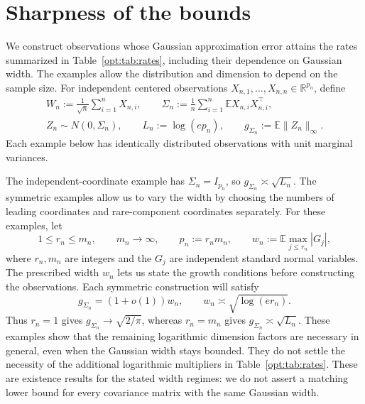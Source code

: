 \documentclass[11pt,letterpaper]{article}
\newenvironment{vSixBlock}{\color{magenta}}{}
\theoremstyle{remark}
\newcommand{\E}{\mathbb E}
\newcommand{\R}{\mathbb R}
\begin{document}
\section{Sharpness of the bounds}\label{opt:section}
\begin{vSixBlock}
We construct observations whose Gaussian approximation error attains
the rates summarized in Table~\ref{opt:tab:rates}, including their
dependence on Gaussian width. The examples allow the distribution
and dimension to depend on the sample size. For independent centered
observations \(X_{n,1},\ldots,X_{n,n}\in\R^{p_n}\), define
\begin{equation}
\begin{gathered}
 W_n:=\frac1{\sqrt n}\sum_{i=1}^nX_{n,i},\qquad
 \Sigma_n:=\frac1n\sum_{i=1}^n\E X_{n,i}X_{n,i}^{\top},\\
 Z_n\sim N(0,\Sigma_n),\qquad
 L_n:=\log(ep_n),\qquad g_{\Sigma_n}:=\E\|Z_n\|_\infty.
\end{gathered}
\label{lower:eq:setup}
\end{equation}
Each example below has identically distributed observations with unit
marginal variances.

The independent-coordinate example has \(\Sigma_n=I_{p_n}\), so
\(g_{\Sigma_n}\asymp\sqrt{L_n}\). The symmetric examples allow us
to vary the width by choosing the numbers of leading coordinates
and rare-component coordinates separately. For these examples, let
\begin{equation}
 1\le r_n\le m_n,\qquad m_n\to\infty,\qquad p_n:=r_nm_n,
 \qquad w_n:=\E\max_{j\le r_n}|G_j|,
 \label{lower:eq:dimensions}
\end{equation}
where \(r_n,m_n\) are integers and the \(G_j\) are independent
standard normal variables. The prescribed width \(w_n\) lets us
state the growth conditions before constructing the observations.
Each symmetric construction will satisfy
\begin{equation}
 g_{\Sigma_n}=(1+o(1))w_n,\qquad
 w_n\asymp\sqrt{\log(er_n)}.
 \label{lower:eq:width-profile}
\end{equation}
Thus \(r_n=1\) gives \(g_{\Sigma_n}\to\sqrt{2/\pi}\), whereas
\(r_n=m_n\) gives \(g_{\Sigma_n}\asymp\sqrt{L_n}\).
These examples show that the remaining logarithmic dimension
factors are necessary in general, even when the Gaussian width
stays bounded. They do not settle the necessity of the additional
logarithmic multipliers in Table~\ref{opt:tab:rates}.
These are existence results for the stated width regimes: we do
not assert a matching lower bound for every covariance matrix
with the same Gaussian width.


\end{vSixBlock}
\end{document}
